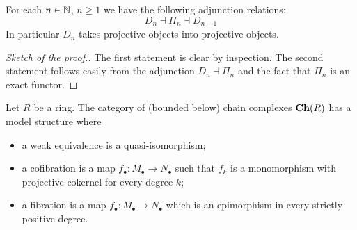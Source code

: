 \begin{lemma} \label{lemma chain complexes}
For each $n \in \mathbb{N}$, $n \ge 1$ we have the following adjunction relations:
\[
D_n \dashv \Pi_n \dashv D_{n+1}
\]
In particular $D_n$ takes projective objects into projective objects.
\end{lemma}

\begin{proof}[Sketch of the proof.]
The first statement is clear by inspection. The second statement follows easily from the adjunction $D_n \dashv \Pi_n$ and the fact that $\Pi_n$ is an exact functor.
\end{proof}

\begin{thm}
Let $R$ be a ring. The category of (bounded below) chain complexes $\mathbf{Ch}(R)$ has a model structure where
\begin{itemize}
\item a weak equivalence is a quasi-isomorphism;
\item a cofibration is a map $f_\bullet \colon M_\bullet \to N_\bullet$ such that $f_k$ is a monomorphism with projective cokernel for every degree $k$;
\item a fibration is a map $f_\bullet \colon M_\bullet \to N_\bullet$ which is an epimorphism in every strictly positive degree.
\end{itemize}
\end{thm}

